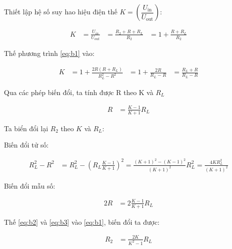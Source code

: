 Thiết lập hệ số suy hao hiệu điện thế $K=\left(\dfrac{U_{\mathrm{in}}}{U_{\mathrm{out}}}\right)$:

\begin{equation}
\begin{aligned}
K
&= \frac{U_{in}}{U_{out}} 
&= \frac{R_2+R+R_L}{R_2} 
&= 1 + \frac{R+R_L}{R_2}
\end{aligned}
\end{equation}

Thế phương trình \eqref{eq:b1} vào:

\begin{equation}
\begin{aligned}
K
&= 1 + \frac{2R(R+R_L)}{R_L^2-R^2} 
&= 1 + \frac{2R}{R_L-R} 
&= \frac{R_L+R}{R_L-R}
\end{aligned}
\end{equation}

Qua các phép biến đổi, ta tính được R theo K và $R_L$

\begin{equation}
\begin{aligned}
R
&= \frac{K-1}{K+1} R_L
\end{aligned}
\end{equation}

Ta biển đổi lại $R_2$ theo $K$ và $R_L$: 

Biến đổi tử số: 

\begin{equation}
\label{eq:b2}
\begin{aligned}
R_L^2-R^2
&= R_L^2 - \left(R_L\frac{K-1}{K+1}\right)^2 
= \frac{(K+1)^2-(K-1)^2}{(K+1)^2} R_L^2 
= \frac{4K R_L^2}{(K+1)^2} 
\end{aligned}
\end{equation}

Biến đổi mẫu số: 

\begin{equation}
\label{eq:b3}
\begin{aligned}
2R
&= 2\frac{K-1}{K+1} R_L
\end{aligned}
\end{equation}


Thế \eqref{eq:b2} và \eqref{eq:b3} vào \eqref{eq:b1}, biến đổi ta được: 

\begin{equation}
\begin{aligned}
R_2
&= \frac{2K}{K^2-1} R_L
\end{aligned}
\end{equation}


